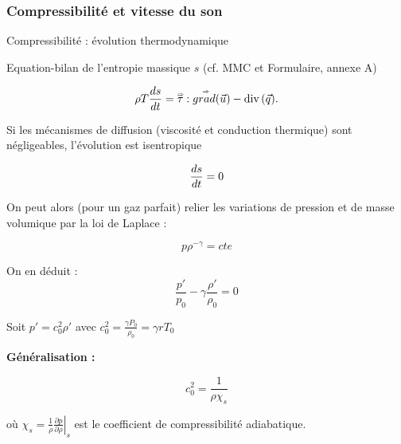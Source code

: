 \subsubsection{Compressibilité et vitesse du son}
\begin{frame}{Compressibilité : évolution thermodynamique}

\small

Equation-bilan de l'entropie massique $s$ (cf. MMC et Formulaire, annexe A)

\begin{equation}
		\rho T \displaystyle \frac{d s}{dt} 
		= \accentset{\Rightarrow}{\tau} : \accentset{\Rightarrow}{grad}(\vec{u}) - \mbox{\rm div}\,(\vec{q}). 
\end{equation}

\pause

Si les mécanismes de diffusion (viscosité et conduction thermique) sont négligeables, l'évolution est {\color{red} isentropique }

$$
\displaystyle \frac{d s}{dt} = 0 
$$

\pause 

On peut alors (pour un gaz parfait) relier les variations de pression et de masse volumique par la loi de Laplace :

\smallskip
$$p\rho^{-\gamma} = cte$$ 

\pause

\smallskip
On en déduit :
$$
\frac{p'}{p_0} - \gamma \frac{\rho'}{\rho_0}  = 0
$$

Soit $p' = c_0^2 \rho'$ avec $c_0^2 = \frac{\gamma P_0}{\rho_0} = \gamma r T_0$


\medskip \pause
\textbf{Généralisation :}  

 $$
 c_0^2 = \frac{1}{\rho \chi_s} 
 $$ 
 
 où 
 $\chi_s = \frac{1}{\rho} {\left. \frac{\partial p}{\partial \rho} \right|}_s$ est le coefficient de compressibilité adiabatique.
 

\vspace{0mm}

\end{frame}



